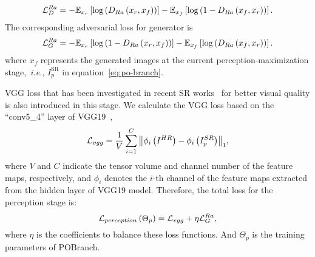 \documentclass[preprint]{elsarticle}
\newcommand{\ie}{\textit{i.e.}}
\begin{document}
\begin{equation}
{\cal L}_D^{Ra} =  -\mathbb{E}{_{{x_r}}}\left[ {\log \left( {{D_{Ra}}\left( {{x_r},{x_f}} \right)} \right)} \right] -\mathbb{E}{_{{x_f}}}\left[ {\log \left( {1 - {D_{Ra}}\left( {{x_f},{x_r}} \right)} \right)} \right].
\end{equation}
The corresponding adversarial loss for generator is
\begin{equation}
{\cal L}_G^{Ra} =  -\mathbb{E}{_{{x_r}}}\left[ {\log \left( {1 - {D_{Ra}}\left( {{x_r},{x_f}} \right)} \right)} \right] - \mathbb{E}{_{{x_f}}}\left[ {\log \left( {{D_{Ra}}\left( {{x_f},{x_r}} \right)} \right)} \right].
\end{equation}
where $x_f$ represents the generated images at the current perception-maximization stage,~\ie, $I_p^\text{SR}$ in equation~\ref{eq:po-branch}.

VGG loss that has been investigated in recent SR works~\cite{Perceptual-loss,SRGAN,EnhanceNet,ESRGAN} for better visual quality is also introduced in this stage. We calculate the VGG loss based on the ``conv5\_4'' layer of VGG19~\cite{VGG19},
\begin{equation}
{{\cal L}_{vgg}} = \frac{1}{V}\sum\limits_{i = 1}^C {{{\left\| {{\phi _i}\left( {{I^{HR}}} \right) - {\phi _i}\left( {I_p^{SR}} \right)} \right\|}_1}} ,
\end{equation}
where $V$ and $C$ indicate the tensor volume and channel number of the feature maps, respectively, and ${{\phi _i}}$ denotes the $i$-th channel of the feature maps extracted from the hidden layer of VGG19 model. Therefore, the total loss for the perception stage is:
\begin{equation}\label{eq:perception-loss}
{{\cal L}_{perception} \left( \Theta_p \right)} = {{\cal L}_{vgg}} + \eta {\cal L}_G^{Ra} ,
\end{equation}
where $\eta$ is the coefficients to balance these loss functions. And $\Theta_p$ is the training parameters of POBranch.
\end{document}

